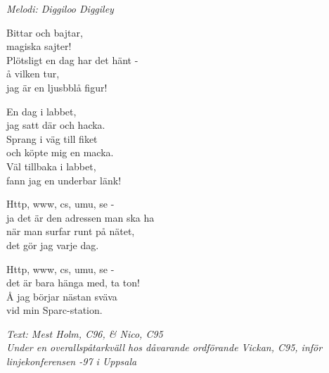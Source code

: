 {\footnotesize\textit{Melodi: Diggiloo Diggiley}}\par
\vspace{10pt}
Bittar och bajtar,\\
magiska sajter!\\
Plötsligt en dag har det hänt -\\
å vilken tur,\\
jag är en ljusbblå figur!\par
\vspace{10pt}
En dag i labbet,\\
jag satt där och hacka.\\
Sprang i väg till fiket\\
och köpte mig en macka.\\
Väl tillbaka i labbet,\\
fann jag en underbar länk!\par
\vspace{10pt}
Http, www, cs, umu, se -\\
ja det är den adressen man ska ha\\
när man surfar runt på nätet,\\
det gör jag varje dag.\par
\vspace{10pt}
Http, www, cs, umu, se -\\
det är bara hänga med, ta ton!\\
Å jag börjar nästan sväva\\
vid min Sparc-station.\par
\vspace{10pt}
{\footnotesize\textit{Text: Mest Holm, C96, \& Nico, C95\\
Under en overallspåtarkväll hos dåvarande ordförande Vickan, C95, inför linjekonferensen -97 i Uppsala}}
